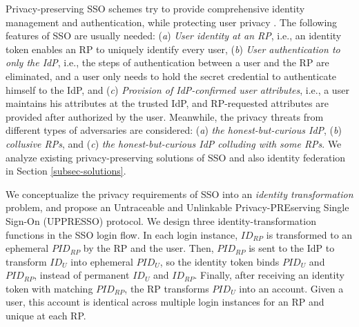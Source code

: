Privacy-preserving SSO schemes try to provide comprehensive identity management and authentication,
    while protecting user privacy \cite{maler2008venn,NIST2017draft,BrowserID,SPRESSO}.
The following features of SSO are usually needed:
(\emph{a}) \emph{User identity at an RP},
    i.e., an identity token enables an RP to uniquely identify every user,
(\emph{b}) \emph{User authentication to only the IdP}, i.e.,
    the steps of authentication between a user and the RP are eliminated,
    and a user only needs to hold the secret credential to authenticate himself to the IdP,
and (\emph{c}) \emph{Provision of IdP-confirmed user attributes},
    i.e., a user maintains his attributes at the trusted IdP,
    and RP-requested attributes are provided %
            after authorized by the user.
Meanwhile,
    the privacy threats from different types of adversaries are considered:
    (\emph{a}) \emph{the honest-but-curious IdP},
    (\emph{b}) \emph{collusive RPs},
    and (\emph{c}) \emph{the honest-but-curious IdP colluding with some RPs}.
We analyze existing privacy-preserving solutions of SSO and also identity federation
in Section \ref{subsec-solutions}.



We conceptualize the privacy requirements of SSO into
  an {\em identity transformation} problem, %
and propose an Untraceable and Unlinkable Privacy-PREserving Single Sign-On (UPPRESSO) protocol.
We design three identity-transformation functions in the SSO login flow.
In each login instance,
        $ID_{RP}$ is transformed to an ephemeral $PID_{RP}$  by the RP and the user.
Then, $PID_{RP}$ is sent to the IdP to transform $ID_U$ into ephemeral $PID_U$,
    so the identity token binds $PID_U$ and $PID_{RP}$, instead of permanent $ID_U$ and $ID_{RP}$.
Finally,
    after receiving an identity token with matching $PID_{RP}$,
        the RP transforms $PID_U$ into an account.
Given a user, this account is identical across multiple login instances for an RP
     and unique at each RP.

